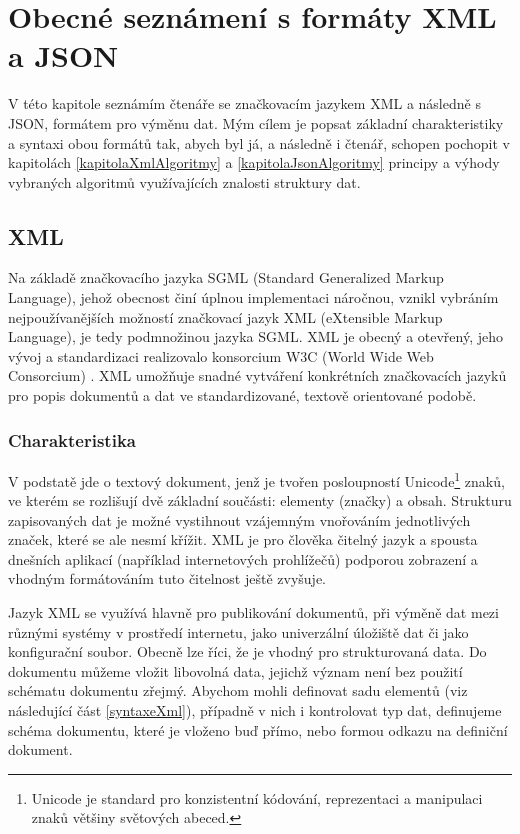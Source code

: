 \chapter{Obecné seznámení s formáty XML a JSON}
V této kapitole seznámím čtenáře se značkovacím jazykem XML a následně s JSON, formátem pro výměnu dat. Mým cílem je popsat základní charakteristiky a syntaxi obou formátů tak, abych byl já, a následně i čtenář, schopen pochopit v kapitolách \ref{kapitolaXmlAlgoritmy} a \ref{kapitolaJsonAlgoritmy} principy a výhody vybraných algoritmů využívajících znalosti struktury dat.

\section{XML}
Na základě značkovacího jazyka SGML (Standard Generalized Markup Language), jehož obecnost činí úplnou implementaci náročnou, vznikl vybráním nejpoužívanějších možností značkovací jazyk XML (eXtensible Markup Language), je tedy podmnožinou jazyka SGML. XML je obecný a otevřený, jeho vývoj a standardizaci realizovalo konsorcium W3C (World Wide Web Consorcium) \cite{w3cxml}. XML umožňuje snadné vytváření konkrétních značkovacích jazyků pro popis dokumentů a dat ve standardizované, textově orientované podobě.

\subsection{Charakteristika}
V podstatě jde o textový dokument, jenž je tvořen posloupností Unicode\footnote{Unicode je standard pro konzistentní kódování, reprezentaci a manipulaci znaků většiny světových abeced.} znaků, ve kterém se rozlišují dvě základní součásti: elementy (značky) a obsah. Strukturu zapisovaných dat je možné vystihnout vzájemným vnořováním jednotlivých značek, které se ale nesmí křížit. XML je pro člověka čitelný jazyk a spousta dnešních aplikací (například internetových prohlížečů) podporou zobrazení a vhodným formátováním tuto čitelnost ještě zvyšuje.

Jazyk XML se využívá hlavně pro publikování dokumentů, při výměně dat mezi různými systémy v prostředí internetu, jako univerzální úložiště dat či jako konfigurační soubor. Obecně lze říci, že je vhodný pro strukturovaná data. Do dokumentu můžeme vložit libovolná data, jejichž význam není bez použití schématu dokumentu zřejmý. Abychom mohli definovat sadu elementů (viz následující část \ref{syntaxeXml}), případně v nich i kontrolovat typ dat, definujeme schéma dokumentu, které je vloženo buď přímo, nebo formou odkazu na definiční dokument.

